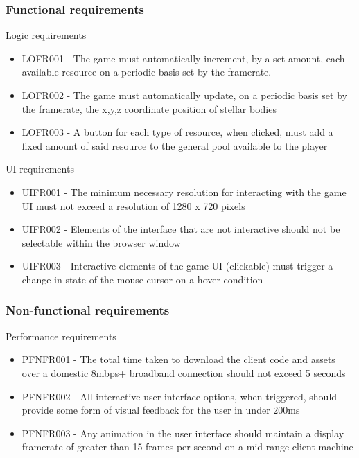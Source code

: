 \documentclass[twoside]{bhamthesis}
\begin{document}
\subsubsection{Functional requirements}

Logic requirements
\begin{itemize}
\item[] LOFR001 - The game must automatically increment, by a set amount, each available resource on a periodic basis set by the framerate.
\item[] LOFR002 - The game must automatically update, on a periodic basis set by the framerate, the x,y,z coordinate position of stellar bodies
\item[] LOFR003 - A button for each type of resource, when clicked, must add a fixed amount of said resource to the general pool available to the player
\end{itemize}

\noindent
UI requirements
\begin{itemize}
\item[] UIFR001 - The minimum necessary resolution for interacting with the game UI must not exceed a resolution of 1280 x 720 pixels
\item[] UIFR002 - Elements of the interface that are not interactive should not be selectable within the browser window
\item[] UIFR003 - Interactive elements of the game UI (clickable) must trigger a change in state of the mouse cursor on a hover condition
\end{itemize}

\subsubsection{Non-functional requirements}

\noindent
Performance requirements
\begin{itemize}
\item[] PFNFR001 - The total time taken to download the client code and assets over a domestic 8mbps+ broadband connection should not exceed 5 seconds
\item[] PFNFR002 - All interactive user interface options, when triggered, should provide some form of visual feedback for the user in under 200ms
\item[] PFNFR003 - Any animation in the user interface should maintain a display framerate of greater than 15 frames per second on a mid-range client machine
\end{itemize}
\end{document}
